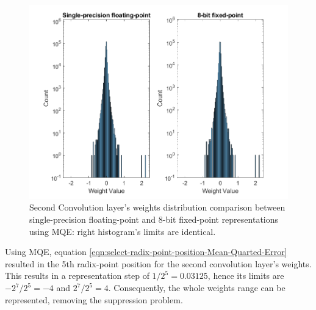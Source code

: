 \begin{figure} [H]
	\centering
	\includegraphics[scale=0.9]{../Images/Weights-distributions/original-vs-fixed8/weight-distribution-conv2-MQE.png}
	\decoRule
	\caption[Second Convolution layer's weights distribution comparison between single-precision floating-point and 8-bit fixed-point representations using MQE]{Second Convolution layer's weights distribution comparison between single-precision floating-point and 8-bit fixed-point representations using MQE: right histogram's limits are identical.}
	\label{fig:weight-distribution-comparison-conv2-MQE}
\end{figure}

Using MQE, equation \ref{eqn:select-radix-point-position-Mean-Quarted-Error} resulted in the 5th radix-point position for the second convolution layer's weights. This results in a representation step of $1/2^5 = 0.03125$, hence its limits are $-2^7/2^5 = -4$ and $2^7/2^5 = 4$. Consequently, the whole weights range can be represented, removing the suppression problem.

